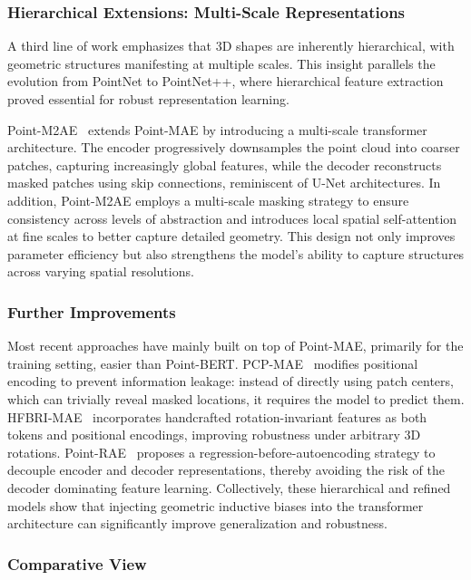 \subsubsection{Hierarchical Extensions: Multi-Scale Representations}
\label{sssec:hierarchical_extensions}

A third line of work emphasizes that 3D shapes are inherently hierarchical, with geometric structures manifesting at multiple scales. This insight parallels the evolution from PointNet to PointNet++, where hierarchical feature extraction proved essential for robust representation learning. 

Point-M2AE~\cite{pm2ae} extends Point-MAE by introducing a multi-scale transformer architecture. The encoder progressively downsamples the point cloud into coarser patches, capturing increasingly global features, while the decoder reconstructs masked patches using skip connections, reminiscent of U-Net architectures. In addition, Point-M2AE employs a multi-scale masking strategy to ensure consistency across levels of abstraction and introduces local spatial self-attention at fine scales to better capture detailed geometry. This design not only improves parameter efficiency but also strengthens the model’s ability to capture structures across varying spatial resolutions.

\subsubsection{Further Improvements}
\label{sssec:further_improvements}

Most recent approaches have mainly built on top of Point-MAE, primarily for the training setting, easier than Point-BERT. PCP-MAE~\cite{pcpmae} modifies positional encoding to prevent information leakage: instead of directly using patch centers, which can trivially reveal masked locations, it requires the model to predict them. HFBRI-MAE~\cite{hfbrimae} incorporates handcrafted rotation-invariant features as both tokens and positional encodings, improving robustness under arbitrary 3D rotations. Point-RAE~\cite{prae} proposes a regression-before-autoencoding strategy to decouple encoder and decoder representations, thereby avoiding the risk of the decoder dominating feature learning. Collectively, these hierarchical and refined models show that injecting geometric inductive biases into the transformer architecture can significantly improve generalization and robustness.

\subsubsection{Comparative View}
\label{sssec:comparative_view}

